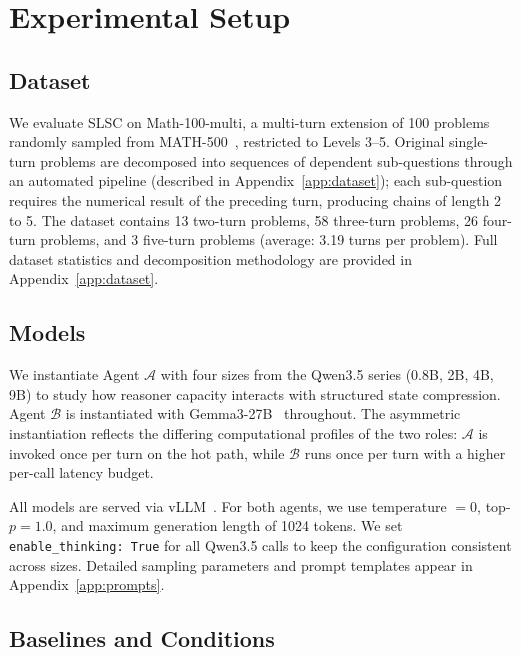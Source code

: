 \section{Experimental Setup}\label{sec:setup}

\subsection{Dataset}\label{sec:dataset}

We evaluate SLSC on Math-100-multi, a multi-turn extension of 100 problems randomly sampled from MATH-500~\citep{lightman2023math500}, restricted to Levels 3--5. Original single-turn problems are decomposed into sequences of dependent sub-questions through an automated pipeline (described in Appendix~\ref{app:dataset}); each sub-question requires the numerical result of the preceding turn, producing chains of length 2 to 5. The dataset contains 13 two-turn problems, 58 three-turn problems, 26 four-turn problems, and 3 five-turn problems (average: 3.19 turns per problem). Full dataset statistics and decomposition methodology are provided in Appendix~\ref{app:dataset}.

\subsection{Models}\label{sec:models}

We instantiate Agent $\mathcal{A}$ with four sizes from the Qwen3.5 series (0.8B, 2B, 4B, 9B) to study how reasoner capacity interacts with structured state compression. Agent $\mathcal{B}$ is instantiated with Gemma3-27B~\citep{gemmateam2025gemma3} throughout. The asymmetric instantiation reflects the differing computational profiles of the two roles: $\mathcal{A}$ is invoked once per turn on the hot path, while $\mathcal{B}$ runs once per turn with a higher per-call latency budget.

All models are served via vLLM~\citep{kwon2023efficient}. For both agents, we use temperature $=0$, top-$p =1.0$, and maximum generation length of 1024 tokens. We set \texttt{enable\_thinking: True} for all Qwen3.5 calls to keep the configuration consistent across sizes. Detailed sampling parameters and prompt templates appear in Appendix~\ref{app:prompts}.

\subsection{Baselines and Conditions}
\label{sec:baselines}

